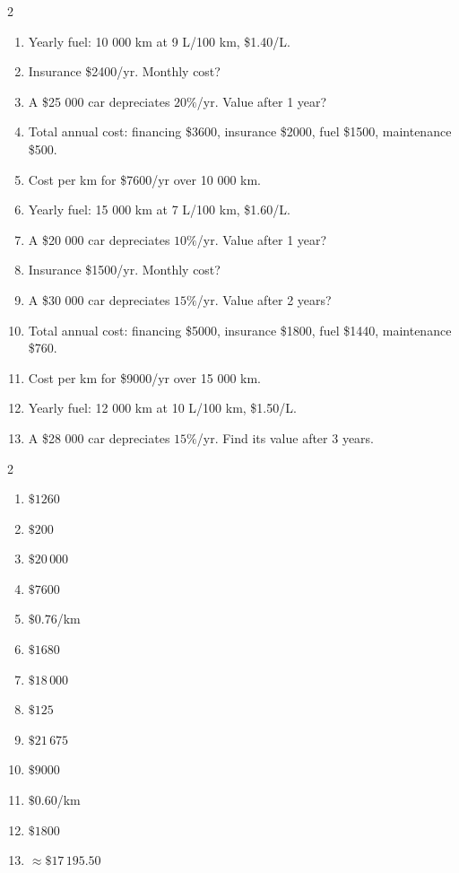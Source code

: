 \documentclass[11pt]{article}
\begin{document}
\begin{recapbox}
\begin{multicols}{2}
\small
\begin{enumerate}[leftmargin=*,itemsep=3pt]
  \item Yearly fuel: 10 000 km at 9 L/100 km, \$1.40/L.
  \item Insurance \$2400/yr. Monthly cost?
  \item A \$25 000 car depreciates $20\%$/yr. Value after 1 year?
  \item Total annual cost: financing \$3600, insurance \$2000, fuel \$1500, maintenance \$500.
  \item Cost per km for \$7600/yr over 10 000 km.
  \item Yearly fuel: 15 000 km at 7 L/100 km, \$1.60/L.
  \item A \$20 000 car depreciates $10\%$/yr. Value after 1 year?
  \item Insurance \$1500/yr. Monthly cost?
  \item A \$30 000 car depreciates $15\%$/yr. Value after 2 years?
  \item Total annual cost: financing \$5000, insurance \$1800, fuel \$1440, maintenance \$760.
  \item Cost per km for \$9000/yr over 15 000 km.
  \item Yearly fuel: 12 000 km at 10 L/100 km, \$1.50/L.
  \item A \$28 000 car depreciates $15\%$/yr. Find its value after 3 years.
\end{enumerate}
\end{multicols}
\end{recapbox}

\begin{keybox}
\begin{multicols}{2}
\small
\begin{enumerate}[leftmargin=*,itemsep=3pt]
  \item $\$1260$
  \item $\$200$
  \item $\$20\,000$
  \item $\$7600$
  \item $\$0.76$/km
  \item $\$1680$
  \item $\$18\,000$
  \item $\$125$
  \item $\$21\,675$
  \item $\$9000$
  \item $\$0.60$/km
  \item $\$1800$
  \item $\approx\$17\,195.50$
\end{enumerate}
\end{multicols}
\end{keybox}
\end{document}
